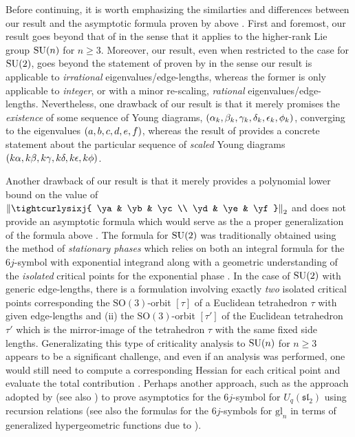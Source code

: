 \documentclass[notitlepage, 10pt]{article}
\begin{document}
Before continuing, it is worth emphasizing the similarties and differences between our result and the asymptotic formula proven by \citeauthor{roberts1999classical} above \cite{roberts1999classical}.
First and foremost, our result goes beyond that of \citeauthor{roberts1999classical} in the sense that it applies to the higher-rank Lie group $\operatorname{SU}(n)$ for $n \geq 3$.
Moreover, our result, even when restricted to the case for $\operatorname{SU}(2)$, goes beyond the statement of proven by \citeauthor{roberts1999classical} in the sense our result is applicable to \textit{irrational} eigenvalues/edge-lengths, whereas the former is only applicable to \textit{integer}, or with a minor re-scaling, \textit{rational} eigenvalues/edge-lengths.
Nevertheless, one drawback of our result is that it merely promises the \textit{existence} of some sequence of Young diagrams, $(\alpha_k, \beta_k, \gamma_k, \delta_k, \epsilon_k, \phi_k)$, converging to the eigenvalues $(a,b,c,d,e,f)$, whereas the result of \citeauthor{roberts1999classical} provides a concrete statement about the particular sequence of \textit{scaled} Young diagrams $(k\alpha, k\beta, k\gamma, k\delta, k\epsilon, k\phi)$.

Another drawback of our result is that it merely provides a polynomial lower bound on the value of $\norm{\tightcurlysixj{ \ya & \yb & \yc \\ \yd & \ye & \yf}}_2$ and does not provide an asymptotic formula which would serve as the a proper generalization of the \citeauthor{ponzano1968semiclassical} formula above \cite{ponzano1968semiclassical}.
The \citeauthor{ponzano1968semiclassical} formula for $\operatorname{SU}(2)$ was traditionally obtained using the method of \textit{stationary phases} which relies on both an integral formula for the $6j$-symbol with exponential integrand along with a geometric understanding of the \textit{isolated} critical points for the exponential phase \cite{ponzano1968semiclassical,gurau2008ponzano}.
In the case of $\operatorname{SU}(2)$ with generic edge-lengths, there is a formulation involving exactly \textit{two} isolated critical points corresponding the $\mathrm{SO}(3)$-orbit $[\tau]$ of a Euclidean tetrahedron $\tau$ with given edge-lengths and (ii) the $\mathrm{SO}(3)$-orbit $[\tau']$ of the Euclidean tetrahedron $\tau'$ which is the mirror-image of the tetrahedron $\tau$ with the same fixed side lengths.
Generalizating this type of criticality analysis to $\operatorname{SU}(n)$ for $n\geq 3$ appears to be a significant challenge, and even if an analysis was performed, one would still need to compute a corresponding Hessian for each critical point and evaluate the total contribution \cite{roberts2002asymptotics}.
Perhaps another approach, such as the approach adopted by \citeauthor{taylor2006sixj} (see also \cite{chen1999asymptotics}) to prove asymptotics for the $6j$-symbol for $U_q(\mathfrak{sl}_2)$ using recursion relations \cite{taylor2006sixj} (see also the formulas for the $6j$-symbols for $\mathrm{gl}_n$ in terms of generalized hypergeometric functions due to \cite{artamonov2024calculation} \cite{artamonov2023classical,artamonov2024calculation}).
\end{document}

